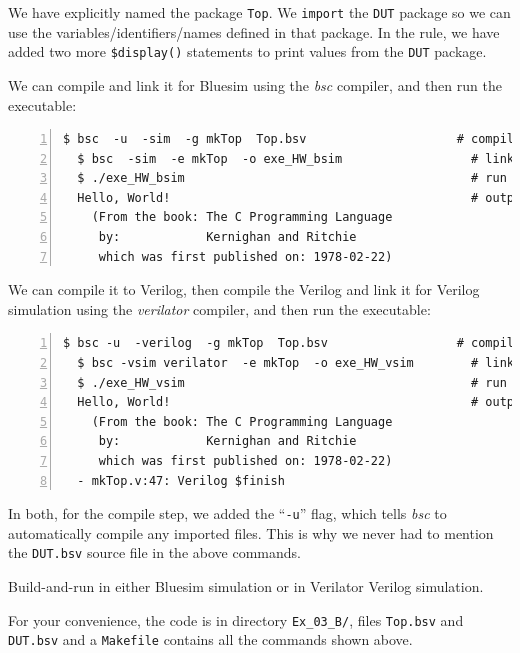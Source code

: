 We have explicitly named the package \verb|Top|.  We \verb|import| the
\verb|DUT| package so we can use the variables/identifiers/names
defined in that package.  In the rule, we have added two more
\verb|$display()| statements to print values from the \verb|DUT|
package.

We can compile and link it for Bluesim using the \emph{bsc} compiler,
and then run the executable:

{\small
\begin{Verbatim}[frame=single, numbers=left]
  $ bsc  -u  -sim  -g mkTop  Top.bsv                     # compile
  $ bsc  -sim  -e mkTop  -o exe_HW_bsim                  # link
  $ ./exe_HW_bsim                                        # run
  Hello, World!                                          # output
    (From the book: The C Programming Language
     by:            Kernighan and Ritchie
     which was first published on: 1978-02-22)
\end{Verbatim}
}

We can compile it to Verilog, then compile the Verilog and link it for
Verilog simulation using the \emph{verilator} compiler, and then run
the executable:

{\small
\begin{Verbatim}[frame=single, numbers=left]
  $ bsc -u  -verilog  -g mkTop  Top.bsv                  # compile -> mkTop.v
  $ bsc -vsim verilator  -e mkTop  -o exe_HW_vsim        # link
  $ ./exe_HW_vsim                                        # run
  Hello, World!                                          # output
    (From the book: The C Programming Language
     by:            Kernighan and Ritchie
     which was first published on: 1978-02-22)
  - mkTop.v:47: Verilog $finish
\end{Verbatim}
}

In both, for the compile step, we added the ``\verb|-u|'' flag, which
tells \emph{bsc} to automatically compile any imported files.  This is
why we never had to mention the \verb|DUT.bsv| source file in the
above commands.

\Beginexercise

\Exercise

Build-and-run in either Bluesim simulation or in Verilator Verilog
simulation.

For your convenience, the code is in directory \verb|Ex_03_B/|, files
\verb|Top.bsv| and \verb|DUT.bsv| and a \verb|Makefile| contains all
the commands shown above.

